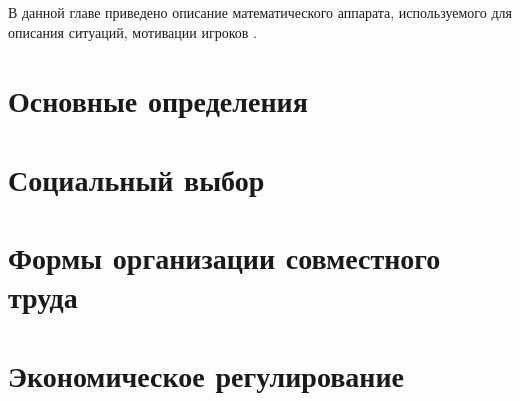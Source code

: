 


В данной главе приведено описание математического аппарата, используемого для описания ситуаций, мотивации игроков \cite{шагин2016теория}.

\section{Основные определения}




\section{Социальный выбор}



\section{Формы организации совместного труда}



\section{Экономическое регулирование}



